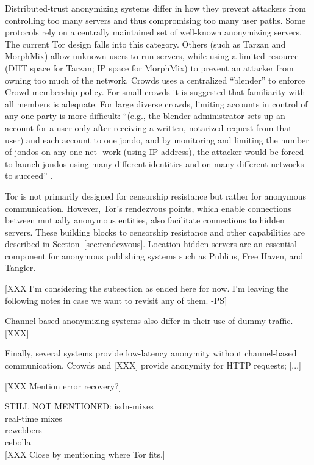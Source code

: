 \documentclass[times,10pt,twocolumn]{article}
\begin{document}
Distributed-trust anonymizing systems differ in how they prevent attackers
from controlling too many servers and thus compromising too many user paths.
Some protocols rely on a centrally maintained set of well-known anonymizing
servers.  The current Tor design falls into this category.
Others (such as Tarzan and MorphMix) allow unknown users to run
servers, while using a limited resource (DHT space for Tarzan; IP space for
MorphMix) to prevent an attacker from owning too much of the network.
Crowds uses a centralized ``blender'' to enforce Crowd membership
policy. For small crowds it is suggested that familiarity with all
members is adequate. For large diverse crowds, limiting accounts in
control of any one party is more difficult: 
``(e.g., the blender administrator sets up an account for a user only
after receiving a written, notarized request from that user) and each
account to one jondo, and by monitoring and limiting the number of
jondos on any one net- work (using IP address), the attacker would be
forced to launch jondos using many different identities and on many
different networks to succeed'' \cite{crowds-tissec}.

Tor is not primarily designed for censorship resistance but rather
for anonymous communication. However, Tor's rendezvous points, which
enable connections between mutually anonymous entities, also
facilitate connections to hidden servers.  These building blocks to
censorship resistance and other capabilities are described in
Section~\ref{sec:rendezvous}.  Location-hidden servers are an
essential component for anonymous publishing systems such as
Publius\cite{publius}, Free Haven\cite{freehaven-berk}, and
Tangler\cite{tangler}.

[XXX I'm considering the subsection as ended here for now. I'm leaving the
following notes in case we want to revisit any of them. -PS]

Channel-based anonymizing systems also differ in their use of dummy traffic.
[XXX]

Finally, several systems provide low-latency anonymity without channel-based
communication.  Crowds and [XXX] provide anonymity for HTTP requests; [...]

[XXX Mention error recovery?]

STILL NOT MENTIONED:
isdn-mixes\\
real-time mixes\\
rewebbers\\
cebolla\\

[XXX Close by mentioning where Tor fits.]
\end{document}

